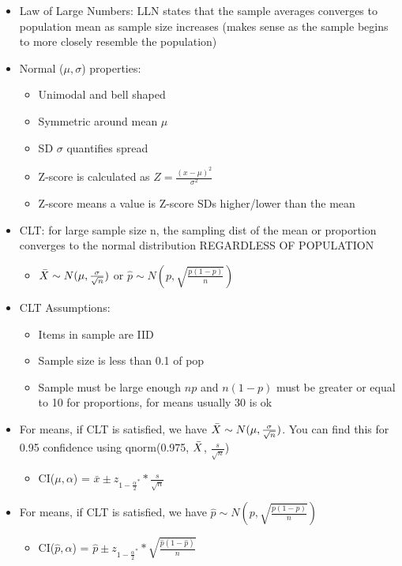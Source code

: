 \documentclass[8pt,landscape,a4paper, fleqn, dvipsnames]{extarticle}
\begin{document}
\begin{multicols*}{4}
\begin{itemize}
    \item Law of Large Numbers: LLN states that the sample averages converges to population mean as sample size increases (makes sense as the sample begins to more closely resemble the population)
    \item Normal ($\mu, \sigma$) properties:
    \begin{itemize}
        \item Unimodal and bell shaped
        \item Symmetric around mean $\mu$
        \item SD $\sigma$ quantifies spread
        \item Z-score is calculated as $Z = \frac{(x - \mu)^2}{\sigma^2}$
        \item Z-score means a value is Z-score SDs higher/lower than the mean
    \end{itemize}
    \item CLT: for large sample size n, the sampling dist of the mean or proportion converges to the normal distribution REGARDLESS OF POPULATION
    \begin{itemize}
        \item $\Bar{X} \sim N(\mu, \frac{\sigma}{\sqrt{n}})$ or $\hat{p} \sim N(p, \sqrt{\frac{p(1 - p)}{n}})$
    \end{itemize}
    \item CLT Assumptions:
    \begin{itemize}
        \item Items in sample are IID
        \item Sample size is less than 0.1 of pop
        \item Sample must be large enough $np$ and $n(1 - p)$ must be greater or equal to 10 for proportions, for means usually 30 is ok
    \end{itemize}
    \item For means, if CLT is satisfied, we have $\Bar{X} \sim N(\mu, \frac{\sigma}{\sqrt{n}})$. You can find this for 0.95 confidence using qnorm(0.975, $\Bar{X}$, $\frac{s}{\sqrt{n}}$)
    \begin{itemize}
        \item CI($\mu, \alpha$) = $\bar{x} \pm z_{1 - \frac{\alpha}{2}^{*}} * \frac{s}{\sqrt{n}}$
    \end{itemize}
    \item For means, if CLT is satisfied, we have $\hat{p} \sim N(p, \sqrt{\frac{p(1 - p)}{n}})$
    \begin{itemize}
        \item CI($\hat{p}, \alpha$) = $\hat{p} \pm z_{1 - \frac{\alpha}{2}^{*}} * \sqrt{\frac{\hat{p}(1 - \hat{p})}{n}}$

\end{itemize}
\end{itemize}
\end{multicols*}
\end{document}
